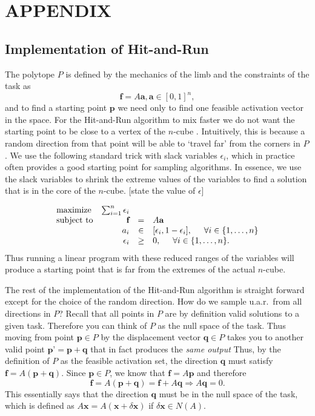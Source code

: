\section{APPENDIX}


\subsection*{Implementation of Hit-and-Run}
The polytope $P$ is defined by the mechanics of the limb and the constraints of the task as
\[\textbf{f} = A\textbf{a}, \textbf{a} \in [0,1]^n,\]
and to find a starting point $\textbf{p}$ we  need only to find one feasible activation vector in the space.
For the Hit-and-Run algorithm to mix faster we do not want the starting point to be close to a vertex of the $n$-cube \cite{Lovasz}. Intuitively, this is because a random direction from that point will be able to `travel far' from the corners in $P$.
We use the following standard trick with slack variables $\epsilon_i$, which in practice often provides a good starting point for sampling algorithms. In essence, we use the slack variables to shrink the extreme values of the variables to find a solution that is in the core of the $n$-cube. [state the value of $\epsilon$]

\begin{equation}\label{eq:LP_r}
\begin{array}{lrcl}
\mbox{maximize} & \sum_{i=1}^n \epsilon_i \\ 
\mbox{subject to} & \textbf{f} &=& A\textbf{a}\\
  & a_i &\in& [\epsilon_i, 1- \epsilon_i], \hspace{5mm} \forall i \in \{1,\dots,n\}  \\
  & \epsilon_i &\geq& 0, \hspace{5mm} \forall i \in \{1,\dots,n\}.  
\end{array}
\end{equation}
Thus running a linear program with these reduced ranges of the variables will produce a starting point that is far from the extremes of the actual $n$-cube.

The rest of the implementation of the Hit-and-Run algorithm is straight forward except for the choice of the random direction. How do we sample u.a.r.\ from all directions in $P$? 
Recall that all points in $P$ are by definition valid solutions to a given task. Therefore you can think of  $P$ as the null space of the task. Thus moving from  point $\textbf{p} \in P$ by the displacement vector  $\textbf{q} \in P$ takes you to another valid point $\textbf{p'}=\textbf{p}  + \textbf{q}$ that in fact produces the \emph{same output}
Thus, by the definition of $P$ as the feasible activation set, the direction $\textbf{q}$ must satisfy $\textbf{f} = A(\textbf{p}+\textbf{q})$. Since $\textbf{p} \in P$, we know that $\textbf{f} = A\textbf{p}$ and therefore 
\[\textbf{f} = A(\textbf{p} + \textbf{q}) = \textbf{f} + A\textbf{q} \Rightarrow A\textbf{q} = 0. \]
This essentially says that the direction $\textbf{q} $ must be in the null space of the task, which is defined as  $A\textbf{x} = A(\textbf{x} + \delta\textbf{x})$ if $\delta\textbf{x} \in N(A)$. 

